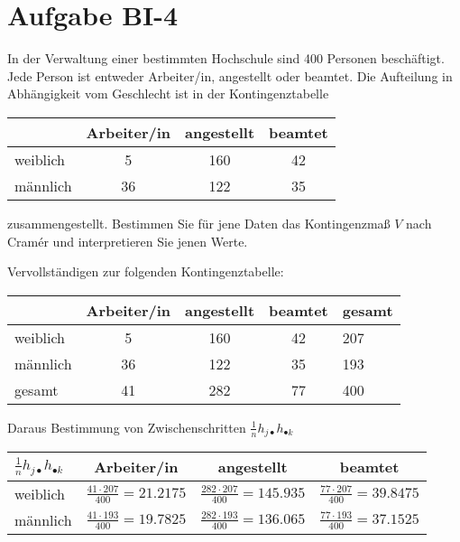 
\section{Aufgabe BI-4}

\begin{task}
    In der Verwaltung einer bestimmten Hochschule sind 400 Personen beschäftigt. Jede Person ist entweder Arbeiter/in, angestellt oder beamtet. Die Aufteilung in Abhängigkeit vom Geschlecht ist in der Kontingenztabelle

    \begin{table}[H]
    \centering
    \begin{tabular}{l|c|c|c}
                 & Arbeiter/in & angestellt & beamtet \\ \hline
        weiblich & 5           & 160        & 42      \\
        männlich & 36          & 122        & 35     
    \end{tabular}
    \end{table}

    zusammengestellt. Bestimmen Sie für jene Daten das Kontingenzmaß $V$ nach Cramér und interpretieren Sie jenen Werte.
\end{task}

Vervollständigen zur folgenden Kontingenztabelle:

\begin{table}[H]
\centering
\begin{tabular}{l|ccc|l}
             & Arbeiter/in & angestellt & beamtet & gesamt \\ \hline
    weiblich & 5           & 160        & 42      & 207    \\
    männlich & 36          & 122        & 35      & 193    \\ \hline
    gesamt   & 41          & 282        & 77      & 400
\end{tabular}
\end{table}

Daraus Bestimmung von Zwischenschritten $\frac1n h_{j\bullet} h_{\bullet k}$

\begin{table}[H]
\centering
\begin{tabular}{l|c|c|c}
    $\frac1n h_{j\bullet} h_{\bullet k}$ & Arbeiter/in                        & angestellt                          & beamtet                            \\ \hline
    weiblich                             & $\frac{41\cdot207}{400} = 21.2175$ & $\frac{282\cdot207}{400} = 145.935$ & $\frac{77\cdot207}{400} = 39.8475$ \\
    männlich                             & $\frac{41\cdot193}{400} = 19.7825$ & $\frac{282\cdot193}{400} = 136.065$ & $\frac{77\cdot193}{400} = 37.1525$
\end{tabular}
\end{table}

